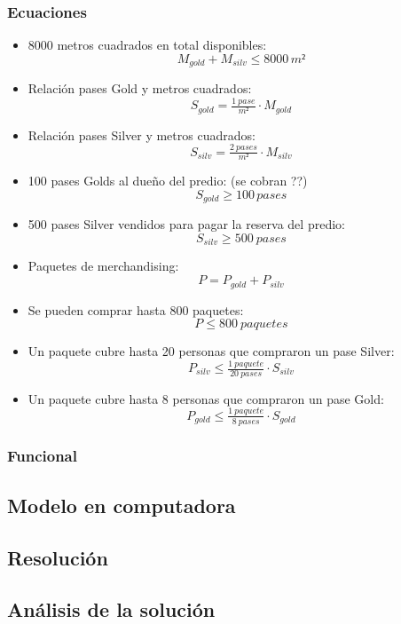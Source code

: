 \documentclass[a4paper]{article}
\begin{document}
\subsubsection{Ecuaciones}

\begin{itemize}
    \item 8000 metros cuadrados en total disponibles:
    $$ M_{gold} + M_{silv}  \leq 8000\,m²$$

    \item Relación pases Gold y metros cuadrados:
    $$ S_{gold} = \tfrac{1\: pase}{m²} \cdot M_{gold} $$

    \item Relación pases Silver y metros cuadrados:
    $$ S_{silv} = \tfrac{2\: pases}{m²} \cdot M_{silv} $$

    \item 100 pases Golds al dueño del predio: (se cobran ??)
    $$ S_{gold} \geq 100\,pases $$

    \item 500 pases Silver vendidos para pagar la reserva del predio:
    $$ S_{silv} \geq 500\: pases$$

    \item Paquetes de merchandising:
    $$ P = P_{gold} + P_{silv} $$

    \item Se pueden comprar hasta 800 paquetes:
    $$ P \leq 800\: paquetes $$

    \item Un paquete cubre hasta 20 personas que compraron un pase Silver:
    $$ P_{silv} \leq \tfrac{1\: paquete} {20\: pases} \cdot S_{silv}$$

    \item Un paquete cubre hasta 8 personas que compraron un pase Gold:
    $$ P_{gold} \leq \tfrac{1\: paquete} {8\: pases} \cdot S_{gold}$$


\end{itemize}

\subsubsection{Funcional}


\subsection{Modelo en computadora}

\subsection{Resolución}

\subsection{Análisis de la solución}
\end{document}
